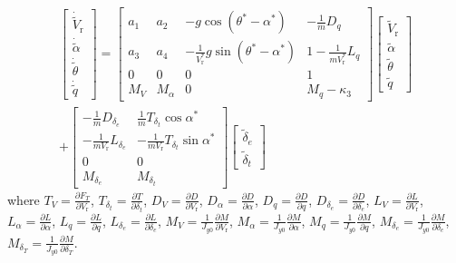 \begin{equation}\label{eq4.64}
\begin{array}{c}
\left[ {\begin{array}{*{20}{c}}
	{{{\dot {\tilde {V}}}_{\mathrm{r}}}}\\
	{\dot{\tilde {\alpha}}  }\\
	{\dot {\tilde {\theta}} }\\
	{\dot {\tilde {q}}}
	\end{array}} \right] = \left[ {\begin{array}{*{20}{c}}
	{a_1}&{ a_2}&{ - g\cos \left( {{\theta ^ * } - {\alpha ^ * }} \right)}&{ - \frac{1}{m}{D_q}}\\
	{a_3}&{a_4}&{ - \frac{1}{{V_\mathrm{r}^ * }}g\sin \left( {{\theta ^ * } - {\alpha ^ * }} \right)}&{1 - \frac{1}{{mV_\mathrm{r}^ * }}{L_q}}\\
	0&0&0&1\\
	{{M_V}}&{{M_\alpha }}&0&{{M_q} - {\kappa _3}}
	\end{array}} \right]\left[ {\begin{array}{*{20}{c}}
	{{{\tilde V}_\mathrm{r}}}\\
	{\tilde \alpha }\\
	{\tilde \theta }\\
	{\tilde q}
	\end{array}} \right]\\
+ \left[ {\begin{array}{*{20}{c}}
	{ - \frac{1}{m}{D_{{\delta _e}}}}&{\frac{1}{m}{T_{{\delta _t}}}\cos {\alpha ^ * }}\\
	{ - \frac{1}{{m{V_\mathrm{r}}}}{L_{{\delta _e}}}}&{ - \frac{1}{{m{V_\mathrm{r}}}}{T_{{\delta _t}}}\sin {\alpha ^ * }}\\
	0&0\\
	{{M_{{\delta _e}}}}&{{M_{{\delta _t}}}}
	\end{array}} \right]\left[ {\begin{array}{*{20}{c}}
	{{{\tilde \delta }_e}}\\
	{{{\tilde \delta }_t}}
	\end{array}} \right]
\end{array}
\end{equation}
where ${T_V} = \frac{{\partial {F_T}}}{{\partial {V\mathrm{_r}}}}$, ${T_{{\delta _t}}} = \frac{{\partial T}}{{\partial {\delta _t}}}$, ${D_V} = \frac{{\partial D}}{{\partial {V\mathrm{_r}}}}$, ${D_\alpha } = \frac{{\partial D}}{{\partial \alpha }}$, ${D_q} = \frac{{\partial D}}{{\partial q}}$, ${D_{{\delta _e}}} = \frac{{\partial D}}{{\partial {\delta _e}}}$, 
${L_V} = \frac{{\partial L}}{{\partial {V\mathrm{_r}}}}$, ${L_\alpha } = \frac{{\partial L}}{{\partial \alpha }}$, ${L_q} = \frac{{\partial L}}{{\partial q}}$, ${L_{{\delta _e}}} = \frac{{\partial L}}{{\partial {\delta _e}}}$, ${M_V} = \frac{1}{{{J_{y0}}}}\frac{{\partial M}}{{\partial {V\mathrm{_r}}}}$, 
${M_\alpha } = \frac{1}{{{J_{y0}}}}\frac{{\partial M}}{{\partial \alpha }}$, ${M_q} = \frac{1}{{{J_{y0}}}}\frac{{\partial M}}{{\partial q}}$, ${M_{{\delta _e}}} = \frac{1}{{{J_{y0}}}}\frac{{\partial M}}{{\partial {\delta _e}}}$, ${M_{{\delta _T}}} = \frac{1}{{{J_{y0}}}}\frac{{\partial M}}{{\partial {\delta _T}}}$.

